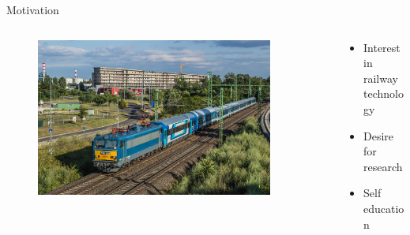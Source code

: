\documentclass[aspectratio=169]{beamer}
\begin{document}
\begin{frame}{Motivation}
    \pause
    \begin{columns}[T]
        \begin{column}{0.3\textwidth}
            \begin{figure}[H]
                \raggedleft
                \includegraphics[width=0.9\textwidth]{./tex_images/gigant.jpg}
            \end{figure}
        \end{column}
        \begin{column}{0.65\textwidth}
            \vspace*{0.5cm}
            \begin{itemize}
                \item Interest in railway technology
                \item Desire for research
                \item Self education
            \end{itemize}
        \end{column}
    \end{columns}
    \pause


\end{frame}
\end{document}
